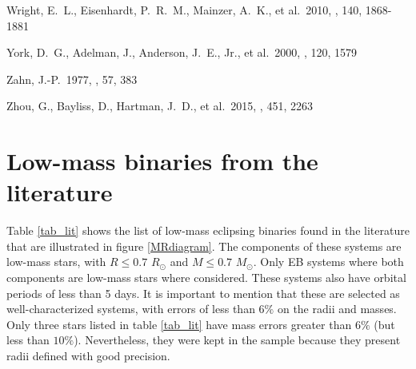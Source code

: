\documentclass[fleqn,usenatbib]{mnras}
\begin{document}
\begin{thebibliography}{99}
 Wright, E.~L., Eisenhardt, P.~R.~M., Mainzer, A.~K., et al.\ 2010, \aj, 140, 1868-1881 

 York, D.~G., Adelman, J., Anderson, J.~E., Jr., et al.\ 2000, \aj, 120, 1579 

 Zahn, J.-P.\ 1977, \aap, 57, 383 

 Zhou, G., Bayliss, D., Hartman, J.~D., et al.\ 2015, \mnras, 451, 2263 

\end{thebibliography}



\appendix

\section{Low-mass binaries from the literature}\label{appen}

Table \ref{tab_lit} shows the list of low-mass eclipsing binaries found in the literature that are illustrated in figure \ref{MRdiagram}. The components of these systems are low-mass stars, with $R \leq 0.7$ $R_{\odot}$ and $M \leq 0.7$ $M_{\odot}$. Only EB systems where both components are low-mass stars where considered. These systems also have orbital periods of less than 5 days. It is important to mention that these are selected as well-characterized systems, with errors of less than $6\%$ on the radii and masses. Only three stars listed in table \ref{tab_lit} have mass errors greater than $6\%$ (but less than $10\%$). Nevertheless, they were kept in the sample because they present radii defined with good precision. 
\end{document}

